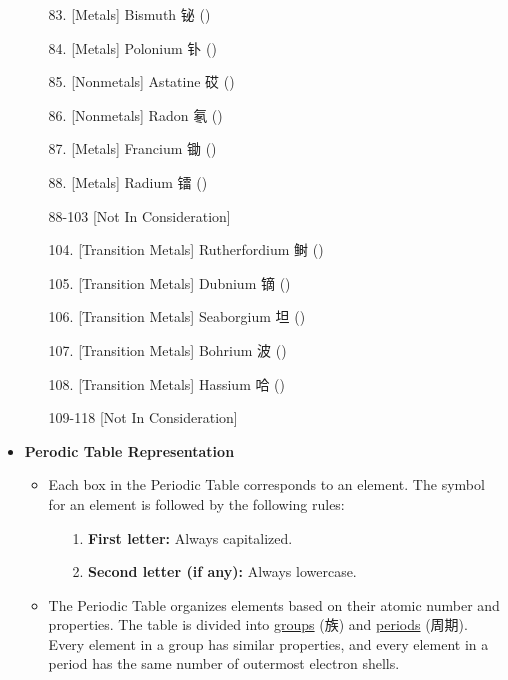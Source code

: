 \begin{itemize}
\begin{itemize}
        \item[83.]      [Metals]                Bismuth         铋  ()
        \item[84.]      [Metals]                Polonium        钋  ()
        \item[85.]      [Nonmetals]             Astatine        砹  ()
        \item[86.]      [Nonmetals]             Radon           氡  ()
        \item[87.]      [Metals]                Francium        锄  ()
        \item[88.]      [Metals]                Radium          镭  ()
        \item[88-103]   [Not In Consideration]
        \item[104.]     [Transition Metals]     Rutherfordium   鲥  ()
        \item[105.]     [Transition Metals]     Dubnium         镝  ()
        \item[106.]     [Transition Metals]     Seaborgium      坦  ()
        \item[107.]     [Transition Metals]     Bohrium         波  ()
        \item[108.]     [Transition Metals]     Hassium         哈  ()
        \item[109-118]  [Not In Consideration] 
    \end{itemize}
    \item \textbf{Perodic Table Representation}
    \begin{itemize}
        \item Each box in the Periodic Table corresponds to an element. The symbol for an element is followed by the following
        rules:
        \begin{itemize}
            \item[1.] \textbf{First letter:} Always capitalized.
            \item[2.] \textbf{Second letter (if any):} Always lowercase.
        \end{itemize}
        \item The Periodic Table organizes elements based on their atomic number and properties. The table is divided into
        \underline{groups} (族) and \underline{periods} (周期). Every element in a group has similar properties, and every
        element in a period has the same number of outermost electron shells.
    \end{itemize}

\end{itemize}
